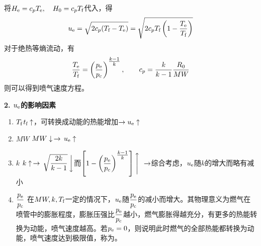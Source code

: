 将$H_{\rm{e}} = c_pT_{\rm{e}}, \quad H_0 =c_p T_{\text{f}}$代入，得
\begin{equation}
	u_{\rm{e}} = \sqrt{2c_p(T_{\text{f}} - T_{\rm{e}})} = \sqrt{2c_p T_{\text{f}} \left(1 - \dfrac{T_{\rm{e}}}{T_{\text{f}}}\right)}
\end{equation}
对于绝热等熵流动，有
\begin{equation*}
	\dfrac{T_{\rm{e}}}{T_{\text{f}}} = \left(\dfrac{p_{\rm{e}}}{p_{\text{c}}}\right)^{\textstyle \frac{k-1}{k}}, \qquad c_p = \dfrac{k}{k-1}\dfrac{R_0}{MW}
\end{equation*}
则可以得到喷气速度方程。


\noindent \textbf{2. $u_{\rm{e}}$的影响因素}
\begin{enumerate}
	\item $T_{\text{f}}$\quad $t_{\text{f}} \uparrow$，可转换成动能的热能增加$\rightarrow u_{\rm{e}} \uparrow$
	\item $MW$ \quad $MW \downarrow \, \rightarrow \, u_{\rm{e}} \uparrow$
	\item $k$ \quad $k \uparrow \, \rightarrow\, \sqrt{\dfrac{2k}{k-1}}\, \bigg \downarrow$而$\displaystyle \left[1 - \left(\dfrac{p_{\rm{e}}}{p_{\text{c}}}\right)^{\textstyle \frac{k-1}{k}}\right] \Bigg \uparrow\, \, \rightarrow$综合考虑，$u_{\rm{e}}$随$k$的增大而略有减小
	\item $\dfrac{p_{\rm{e}}}{p_{\text{c}}}$ \quad 在$MW,k,T_{\text{f}}$一定的情况下，$u_{\rm{e}}$随$\dfrac{p_{\rm{e}}}{p_{\text{c}}}$的减小而增大。其物理意义为燃气在喷管中的膨胀程度，膨胀压强比$\dfrac{p_{\rm{e}}}{p_{\text{c}}}$越小，燃气膨胀得越充分，有更多的热能转换为动能，喷气速度越高。若$p_{\rm{e}} = 0$，则说明此时燃气的全部热能都转换为动能，喷气速度达到极限值，称为。
\end{enumerate}

